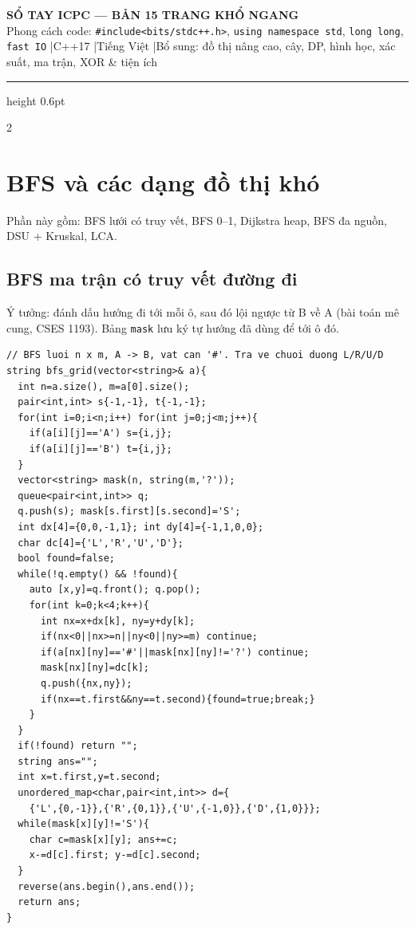 \documentclass[8pt]{extarticle}
\begin{document}
\fontsize{8}{9.5}\selectfont

\begin{center}
{\Large\bfseries SỔ TAY ICPC — BẢN 15 TRANG KHỔ NGANG}\\[2pt]
{\small Phong cách code: \texttt{\#include<bits/stdc++.h>}, \texttt{using namespace std}, \texttt{long long}, \texttt{fast IO} \quad|\quad C++17 \quad|\quad Tiếng Việt \quad|\quad Bổ sung: đồ thị nâng cao, cây, DP, hình học, xác suất, ma trận, XOR \& tiện ích}
\end{center}
\vspace{-2pt}
\tableofcontents
\hrule height 0.6pt
\medskip

\begin{multicols}{2}

\section{BFS và các dạng đồ thị khó}
Phần này gồm: BFS lưới có truy vết, BFS 0--1, Dijkstra heap, BFS đa nguồn, DSU + Kruskal, LCA.

\subsection{BFS ma trận có truy vết đường đi}
Ý tưởng: đánh dấu hướng đi tới mỗi ô, sau đó lội ngược từ B về A (bài toán mê cung, CSES 1193). Bảng \texttt{mask} lưu ký tự hướng đã dùng để tới ô đó.
\begin{lstlisting}
// BFS luoi n x m, A -> B, vat can '#'. Tra ve chuoi duong L/R/U/D
string bfs_grid(vector<string>& a){
  int n=a.size(), m=a[0].size();
  pair<int,int> s{-1,-1}, t{-1,-1};
  for(int i=0;i<n;i++) for(int j=0;j<m;j++){
    if(a[i][j]=='A') s={i,j};
    if(a[i][j]=='B') t={i,j};
  }
  vector<string> mask(n, string(m,'?'));
  queue<pair<int,int>> q;
  q.push(s); mask[s.first][s.second]='S';
  int dx[4]={0,0,-1,1}; int dy[4]={-1,1,0,0};
  char dc[4]={'L','R','U','D'};
  bool found=false;
  while(!q.empty() && !found){
    auto [x,y]=q.front(); q.pop();
    for(int k=0;k<4;k++){
      int nx=x+dx[k], ny=y+dy[k];
      if(nx<0||nx>=n||ny<0||ny>=m) continue;
      if(a[nx][ny]=='#'||mask[nx][ny]!='?') continue;
      mask[nx][ny]=dc[k];
      q.push({nx,ny});
      if(nx==t.first&&ny==t.second){found=true;break;}
    }
  }
  if(!found) return "";
  string ans="";
  int x=t.first,y=t.second;
  unordered_map<char,pair<int,int>> d={
    {'L',{0,-1}},{'R',{0,1}},{'U',{-1,0}},{'D',{1,0}}};
  while(mask[x][y]!='S'){
    char c=mask[x][y]; ans+=c;
    x-=d[c].first; y-=d[c].second;
  }
  reverse(ans.begin(),ans.end());
  return ans;
}
\end{lstlisting}


\end{multicols}
\end{document}
